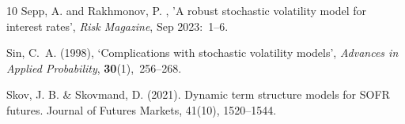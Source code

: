 \documentclass[pdftex,11pt,a4paper] {article}
\begin{document}
\begin{thebibliography}{10}
 Sepp, A. and Rakhmonov, P. \harvardyearright, 'A robust stochastic volatility model for interest rates', {\em Risk Magazine}, Sep 2023:~1--6.

Sin, C.~A.  (1998), `Complications with  stochastic volatility models', {\em Advances in Applied Probability}, {\bf   30}(1),~256--268.


Skov, J. B. \& Skovmand, D. (2021). Dynamic term structure models for SOFR futures. Journal of Futures Markets, 41(10), 1520--1544.

\end{thebibliography}


\appendix
\end{document}

